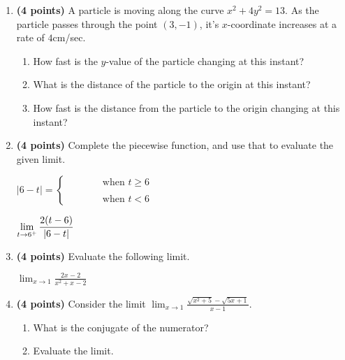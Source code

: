\documentclass[12pt]{amsart}
\begin{document}
\begin{enumerate}
\vspace{2cm}
\newpage\def \b{4}\def \x{3}\def \y{-1}\def \xchange{4}\def \ratrhs{-3}\def \cirrhs{13}\def \hyprhs{5}\def \compy{4y^{2}}\def \ychangenum{-4}\def \dist{10}\def \fracrat{\frac{64}{3}}\def \fraccirc{18}\def \frachyp{30}
\item {\bf (4 points)} 
 A particle is moving along the curve $x^2 + \compy = \cirrhs$. As the particle passes through the point $(\x,\y)$, it's $x$-coordinate increases at a rate of $\xchange$cm/sec. \begin{enumerate}
\item How fast is the $y$-value of the particle changing at this instant? \vfill
\item What is the distance of the particle to the origin at this instant? \vfill
\item How fast is the distance from the particle to the origin changing at this instant? \vfill
\end{enumerate}

\newpage\def \a{6}\def \k{2}\def \abstop{0}\def \ktop{1}
\item {\bf (4 points)} 
 Complete the piecewise function, and use that to evaluate the given limit.

\vspace{.5cm}

$|\a - t| = \begin{cases} \hspace{1cm} & \text{ when } t \geq \a \\ & \\ \hspace{1cm} & \text{ when } t < \a \end{cases}$

\vspace{.5cm}

$\displaystyle \lim_{t \rightarrow \a^+} \frac{\ifthenelse{\ktop=1}{\k}{}\ifthenelse{\abstop=1}{|\a-t|}{(t-\a)}}{\ifthenelse{\ktop=0}{\k}{}\ifthenelse{\abstop=0}{|\a-t|}{(t-\a)}}$

\vfill 
\def \a{1}\def \b{-2}\def \k{2}\def \fancyp{x^{2}+x^{}-2}\def \simplep{2x^{}-2}\def \fancyreduced{3}\def \niceanstop{\frac{3}{2}}\def \niceansbottom{\frac{2}{3}}
\item {\bf (4 points)} 
 Evaluate the following limit. 

$\displaystyle \lim_{x\rightarrow \a} \frac{\simplep}{\fancyp}$

\vfill 
\newpage\def \a{1}\def \b{4}\def \ab{4}\def \c{5}\def \amb{-3}\def \ansroot{6}\def \firstroot{x^{2}+5}\def \secondroot{5x^{}+1}\def \porm{-1}
\item {\bf (4 points)} 
 Consider the limit $\displaystyle \lim_{x \rightarrow \a} \frac{\sqrt{\firstroot} - \sqrt{\secondroot}}{x-\a}$. \begin{enumerate}
\item What is the conjugate of the numerator? \vspace{3cm}
\item Evaluate the limit.
\end{enumerate}


\end{enumerate}
\end{document}
